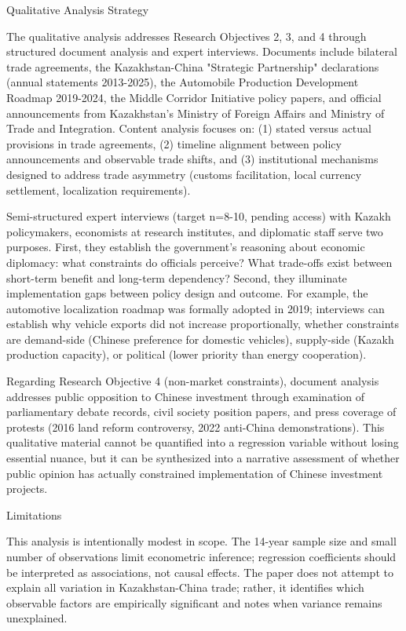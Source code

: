 \documentclass[12pt]{article}
\begin{document}
Qualitative Analysis Strategy\par
The qualitative analysis addresses Research Objectives 2, 3, and 4 through structured document analysis and expert interviews. Documents include bilateral trade agreements, the Kazakhstan-China "Strategic Partnership" declarations (annual statements 2013-2025), the Automobile Production Development Roadmap 2019-2024, the Middle Corridor Initiative policy papers, and official announcements from Kazakhstan's Ministry of Foreign Affairs and Ministry of Trade and Integration. Content analysis focuses on: (1) stated versus actual provisions in trade agreements, (2) timeline alignment between policy announcements and observable trade shifts, and (3) institutional mechanisms designed to address trade asymmetry (customs facilitation, local currency settlement, localization requirements).\par
Semi-structured expert interviews (target n=8-10, pending access) with Kazakh policymakers, economists at research institutes, and diplomatic staff serve two purposes. First, they establish the government's reasoning about economic diplomacy: what constraints do officials perceive? What trade-offs exist between short-term benefit and long-term dependency? Second, they illuminate implementation gaps between policy design and outcome. For example, the automotive localization roadmap was formally adopted in 2019; interviews can establish why vehicle exports did not increase proportionally, whether constraints are demand-side (Chinese preference for domestic vehicles), supply-side (Kazakh production capacity), or political (lower priority than energy cooperation).\par
Regarding Research Objective 4 (non-market constraints), document analysis addresses public opposition to Chinese investment through examination of parliamentary debate records, civil society position papers, and press coverage of protests (2016 land reform controversy, 2022 anti-China demonstrations). This qualitative material cannot be quantified into a regression variable without losing essential nuance, but it can be synthesized into a narrative assessment of whether public opinion has actually constrained implementation of Chinese investment projects.\par
Limitations\par
This analysis is intentionally modest in scope. The 14-year sample size and small number of observations limit econometric inference; regression coefficients should be interpreted as associations, not causal effects. The paper does not attempt to explain all variation in Kazakhstan-China trade; rather, it identifies which observable factors are empirically significant and notes when variance remains unexplained.\par
\end{document}
